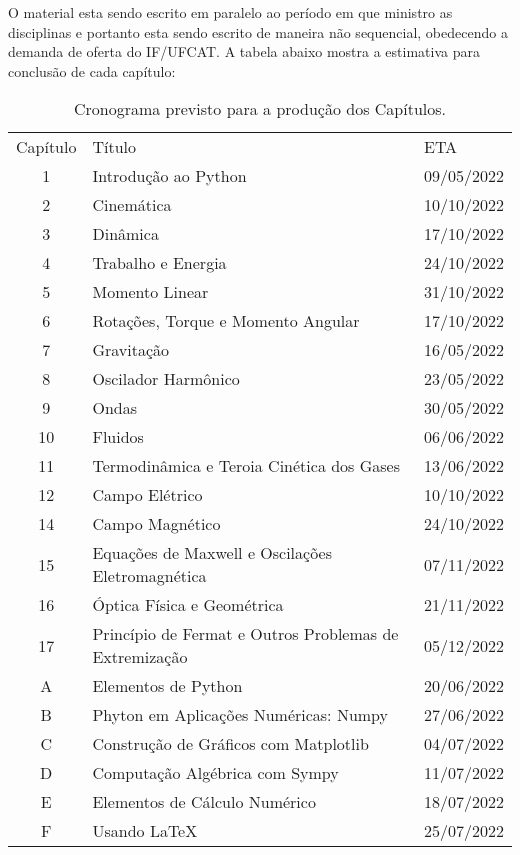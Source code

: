 O material esta sendo escrito em paralelo ao período em que ministro as disciplinas e portanto esta sendo escrito de maneira não sequencial, obedecendo a demanda de oferta do IF/UFCAT. A tabela abaixo mostra a estimativa para conclusão de cada capítulo:

\begin{table}[h]
    \centering
    \begin{tabular}{cll}
        Capítulo & Título & ETA  \\
        1 & Introdução ao Python & 09/05/2022 \\
        2 & Cinemática & 10/10/2022 \\
        3 & Dinâmica & 17/10/2022 \\ 
        4 & Trabalho e Energia & 24/10/2022 \\
        5 & Momento Linear & 31/10/2022 \\
        6 & Rotações, Torque e Momento Angular & 17/10/2022 \\
        7 & Gravitação & 16/05/2022 \\
        8 & Oscilador Harmônico & 23/05/2022 \\
        9 & Ondas & 30/05/2022 \\
        10 & Fluidos & 06/06/2022 \\
        11 & Termodinâmica e Teroia Cinética dos Gases & 13/06/2022\\
        12 & Campo Elétrico & 10/10/2022 \\
        14 & Campo Magnético & 24/10/2022 \\
        15 & Equações de Maxwell e Oscilações Eletromagnética & 07/11/2022\\
        16 & Óptica Física e Geométrica & 21/11/2022 \\
        17 & Princípio de Fermat e Outros Problemas de Extremização & 05/12/2022 \\
        A  & Elementos de Python & 20/06/2022 \\
        B  & Phyton em Aplicações Numéricas: Numpy & 27/06/2022 \\
        C  & Construção de Gráficos com Matplotlib & 04/07/2022 \\
        D  & Computação Algébrica com Sympy & 11/07/2022 \\
        E  & Elementos de Cálculo Numérico & 18/07/2022 \\
        F  & Usando \LaTeX & 25/07/2022
    \end{tabular}
    \caption{Cronograma previsto para a produção dos Capítulos.}
\end{table}
